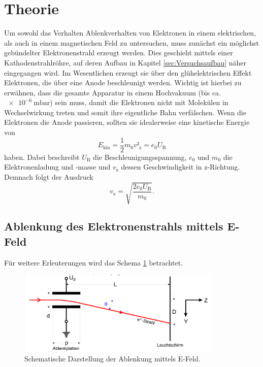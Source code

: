 \section{Theorie}
\label{sec:Theorie}

Um sowohl das Verhalten Ablenkverhalten von Elektronen in einem elektrischen, als auch in einem magnetischen Feld zu untersuchen, muss zunächst ein möglichst gebündelter Elektronenstrahl erzeugt werden.
Dies geschieht mittels einer Kathodenstrahlröhre, auf deren Aufbau in Kapitel \ref{sec:Versuchsaufbau} näher eingegangen wird.
Im Wesentlichen erzeugt sie über den glühelektrischen Effekt Elektronen, die über eine Anode beschleunigt werden.
Wichtig ist hierbei zu erwähnen, dass die gesamte Apparatur in einem Hochvakuum (bis ca. $\SI{e-6}{\milli\bar}$) sein muss, damit die Elektronen nicht mit Molekülen in Wechselwirkung treten und somit ihre eigentliche Bahn verfälschen.
Wenn die Elektronen die Anode passieren, sollten sie idealerweise eine kinetische Energie von
\begin{equation}
  E_{\text{kin}} = \frac{1}{2}m_0 v²_{\text{z}} = e_0 U_{\text{B}}
\end{equation}
haben.
Dabei beschreibt $U_{\text{B}}$ die Beschleunigungsspannung, $e_0$ und $m_0$ die Elektronenladung und -masse und $v_{\text{z}}$ dessen Geschwindigkeit in z-Richtung.
Demnach folgt der Ausdruck
\begin{equation}
  v_{\text{z}} = \sqrt{\frac{2 e_0 U_{\text{B}}}{m_0}}. \label{eqn:1}
\end{equation}

\subsection{Ablenkung des Elektronenstrahls mittels E-Feld}
Für weitere Erleuterungen wird das Schema \ref{fig:1} betrachtet.

\begin{figure}
  \centering
  \includegraphics[height=4cm]{ressources/schema.png}
  \caption{Schematische Darstellung der Ablenkung mittels E-Feld. \cite{skript}}
  \label{fig:1}
\end{figure}

